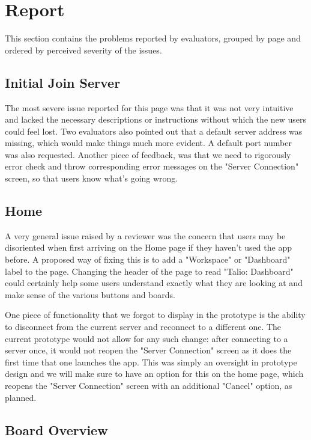 \section{Report}

This section contains the problems reported by evaluators, grouped by page and ordered by perceived severity of the issues.

\subsection{Initial Join Server}
The most severe issue reported for this page was that it was not very intuitive and lacked the necessary descriptions or instructions without which the new users could feel lost. Two evaluators also pointed out that a default server address was missing, which would make things much more evident. A default port number was also requested. \newline
Another piece of feedback, was that we need to rigorously error check and throw corresponding error messages on the "Server Connection" screen, so that users know what's going wrong.

\subsection{Home}

A very general issue raised by a reviewer was the concern that users may be disoriented when first arriving on the Home page if they haven't used the app before. A proposed way of fixing this is to add a "Workspace" or "Dashboard" label to the page. Changing the header of the page to read "Talio: Dashboard" could certainly help some users understand exactly what they are looking at and make sense of the various buttons and boards.

One piece of functionality that we forgot to display in the prototype is the ability to disconnect from the current server and reconnect to a different one. The current prototype would not allow for any such change: after connecting to a server once, it would not reopen the "Server Connection" screen as it does the first time that one launches the app. This was simply an oversight in prototype design and we will make sure to have an option for this on the home page, which reopens the "Server Connection" screen with an additional "Cancel" option, as planned.

\subsection{Board Overview}

